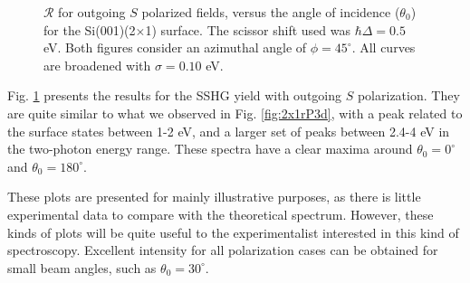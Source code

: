 \begin{figure}[H]
\centering
{}\hfill
{}
\caption{$\mathcal{R}$ for outgoing $S$ polarized fields, versus the angle of
incidence ($\theta_{0}$) for the Si(001)(2$\times$1) surface. The scissor shift
used was $\hbar\Delta = 0.5$ eV. Both figures consider an azimuthal angle of
$\phi = 45^{\circ}$. All curves are broadened with $\sigma = 0.10$ eV.}
\label{fig:2x1rS3d}
\end{figure}

Fig. \ref{fig:2x1rS3d} presents the results for the SSHG yield with outgoing $S$
polarization. They are quite similar to what we observed in Fig.
\ref{fig:2x1rP3d}, with a peak related to the surface states between 1-2 eV, and
a larger set of peaks between 2.4-4 eV in the two-photon energy range. These
spectra have a clear maxima around $\theta_{0} = 0^{\circ}$ and $\theta_{0} =
180^{\circ}$.

These plots are presented for mainly illustrative purposes, as there is little
experimental data to compare with the theoretical spectrum. However, these kinds
of plots will be quite useful to the experimentalist interested in this kind of
spectroscopy. Excellent intensity for all polarization cases can be obtained for
small beam angles, such as $\theta_{0} = 30^{\circ}$.


